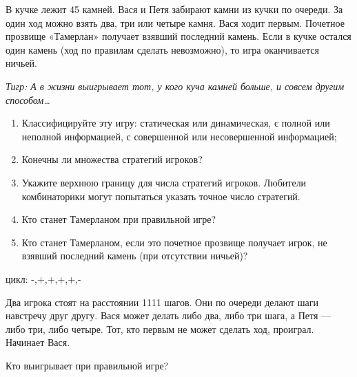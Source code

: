 \begin{problem}[Тамерлан]\par
В кучке лежит 45 камней. Вася и Петя забирают камни из кучки по очереди. За один ход можно взять два, три или четыре камня. Вася ходит первым. Почетное прозвище «Тамерлан» получает взявший последний камень. Если в кучке остался один камень (ход по правилам сделать невозможно), то игра оканчивается ничьей.\par
{\it Тигр: А в жизни выигрывает тот, у кого куча камней больше, и совсем другим способом\ldots }\par
\begin{enumerate}
\item	 Классифицируйте эту игру: статическая или динамическая, с полной или неполной информацией, с совершенной или несовершенной информацией;\par
\item	Конечны ли множества стратегий игроков?\par
\item	Укажите верхнюю границу для числа стратегий игроков. Любители комбинаторики могут попытаться указать точное число стратегий.\par
\item	Кто станет Тамерланом при правильной игре?\par
\item	Кто станет Тамерланом, если это почетное прозвище получает игрок, не взявший последний камень (при отсутствии ничьей)?
\end{enumerate}

\begin{sol}
 цикл: -,+,+,+,+,-
\end{sol}
\end{problem}

\begin{problem}
Два игрока стоят на расстоянии 1111 шагов. Они по очереди делают шаги навстречу друг другу. Вася может делать либо два, либо три шага, а Петя — либо три, либо четыре. Тот, кто первым не может сделать ход, проиграл. Начинает Вася.\par
Кто выигрывает при правильной игре?\par

\begin{sol}

\end{sol}
\end{problem}




